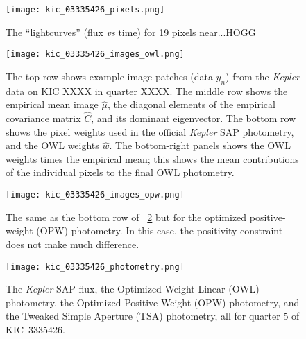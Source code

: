 \documentclass[12pt, letterpaper, preprint]{aastex}
\newcommand{\project}[1]{\textsl{#1}}
\newcommand{\foreign}[1]{\textsl{#1}}
\begin{document}
\clearpage
\begin{figure}
\texttt{[image: kic\_03335426\_pixels.png]}
\caption{
The ``lightcurves'' (flux \foreign{vs} time) for 19 pixels near...HOGG
\label{fig:pixels}}
\end{figure}

\clearpage
\begin{figure}
\texttt{[image: kic\_03335426\_images\_owl.png]}
\caption{
The top row shows example image patches (data $y_n$) from the \project{Kepler} data on KIC XXXX in quarter XXXX.
The middle row shows the empirical mean image $\hat{\mu}$,
  the diagonal elements of the empirical covariance matrix $\hat{C}$,
  and its dominant eigenvector.
The bottom row shows the pixel weights used in the official \project{Kepler} SAP photometry,
  and the OWL weights $\hat{w}$.
The bottom-right panels shows the OWL weights times the empirical mean;
  this shows the mean contributions of the individual pixels to the final OWL photometry.
\label{fig:images}}
\end{figure}

\clearpage
\begin{figure}
\texttt{[image: kic\_03335426\_images\_opw.png]}
\caption{
The same as the bottom row of \figurename~\ref{fig:images}
  but for the optimized positive-weight (OPW) photometry.
In this case, the positivity constraint does not make much difference.
\label{fig:images_opw}}
\end{figure}

\clearpage
\begin{figure}
\texttt{[image: kic\_03335426\_photometry.png]}
\caption{
The \project{Kepler} SAP flux,
  the Optimized-Weight Linear (OWL) photometry,
  the Optimized Positive-Weight (OPW) photometry,
  and the Tweaked Simple Aperture (TSA) photometry,
  all for quarter 5 of KIC~3335426.
\label{fig:results}}
\end{figure}
\end{document}
